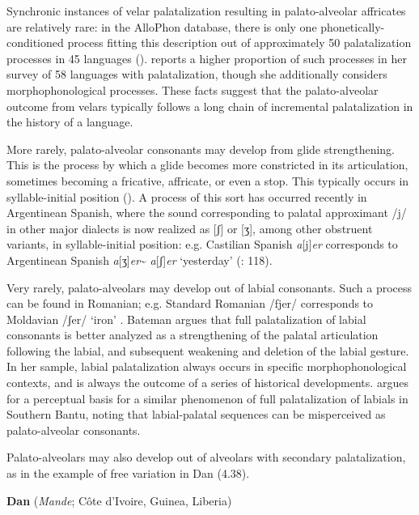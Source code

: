   Synchronic instances of velar palatalization resulting in palato-alveolar affricates are relatively rare: in the AlloPhon database, there is only one phonetically-conditioned process fitting this description out of approximately 50 palatalization processes in 45 languages (\citealt{BybeeEasterday2019}). \citet{Bateman2007} reports a higher proportion of such processes in her survey of 58 languages with palatalization, though she additionally considers morphophonological processes. These facts suggest that the palato-alveolar outcome from velars typically follows a long chain of incremental palatalization in the history of a language.

  More rarely, palato-alveolar consonants may develop from glide strengthening. This is the process by which a glide becomes more constricted in its articulation, sometimes becoming a fricative, affricate, or even a stop. This typically occurs in syllable-initial position (\citealt{BybeeEasterday2019}). A process of this sort has occurred recently in Argentinean Spanish, where the sound corresponding to palatal approximant /j/ in other major dialects is now realized as [ʃ] or [ʒ], among other obstruent variants, in syllable-initial position: e.g. Castilian Spanish \textit{a}[j]\textit{er} corresponds to Argentinean Spanish \textit{a}[ʒ]\textit{er}{\textasciitilde} \textit{a}[ʃ]\textit{er} ‘yesterday’ (\citealt{HarrisKaisse1999}: 118).

  Very rarely, palato-alveolars may develop out of labial consonants. Such a process can be found in Romanian; e.g. Standard Romanian /fjer/ corresponds to Moldavian /ʃer/ ‘iron’ \citep[108]{Bateman2007}. Bateman argues that full palatalization of labial consonants is better analyzed as a strengthening of the palatal articulation following the labial, and subsequent weakening and deletion of the labial gesture. In her sample, labial palatalization always occurs in specific morphophonological contexts, and is always the outcome of a series of historical developments. \citet{Ohala1978} argues for a perceptual basis for a similar phenomenon of full palatalization of labials in Southern Bantu, noting that labial-palatal sequences can be misperceived as palato-alveolar consonants.

  Palato-alveolars may also develop out of alveolars with secondary palatalization, as in the example of free variation in Dan (4.38).

\ea\label{ex:(4.38)}
   \textbf{Dan} (\textit{Mande}; Côte d’Ivoire, Guinea, Liberia)

